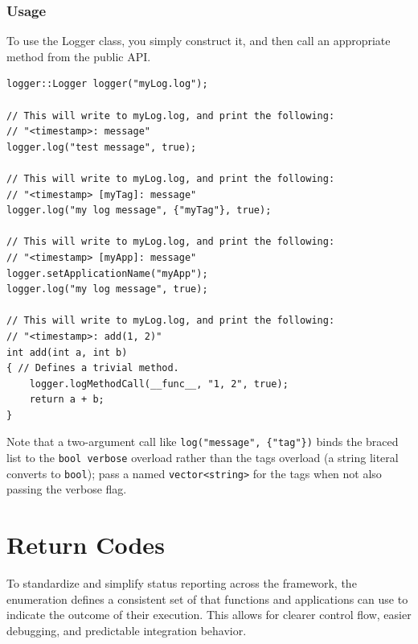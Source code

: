 \subsubsection{Usage}

To use the Logger class, you simply construct it, and then call an appropriate method from the public API.
\begin{lstlisting}[style=cppstyle]
logger::Logger logger("myLog.log");

// This will write to myLog.log, and print the following:
// "<timestamp>: message"
logger.log("test message", true);

// This will write to myLog.log, and print the following:
// "<timestamp> [myTag]: message"
logger.log("my log message", {"myTag"}, true);

// This will write to myLog.log, and print the following:
// "<timestamp> [myApp]: message"
logger.setApplicationName("myApp");
logger.log("my log message", true);

// This will write to myLog.log, and print the following:
// "<timestamp>: add(1, 2)"
int add(int a, int b)
{ // Defines a trivial method.
	logger.logMethodCall(__func__, "1, 2", true);
	return a + b;
}
\end{lstlisting}

Note that a two-argument call like \texttt{log("message", \{"tag"\})} binds the braced list to the \texttt{bool verbose} overload rather than the tags overload (a string literal converts to \texttt{bool}); pass a named \texttt{vector<string>} for the tags when not also passing the verbose flag.






























\section{Return Codes}\label{section:return_codes}

To standardize and simplify status reporting across the framework, the  enumeration defines a consistent set of  that functions and applications can use to indicate the outcome of their execution. This allows for clearer control flow, easier debugging, and predictable integration behavior.

